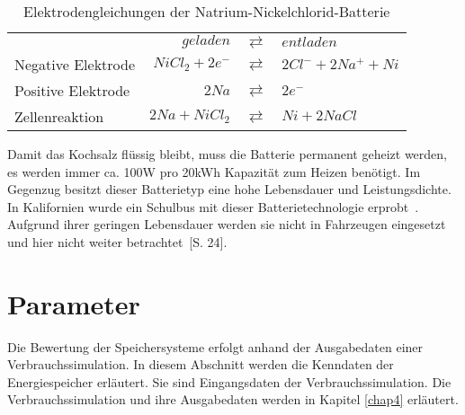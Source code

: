 \begin{table}\centering %
	\begin{tabularx}{\linewidth}{XrcX}
		\toprule
		&       $geladen$ & $\rightleftarrows$ & $entladen$           \\
		Negative Elektrode & $NiCl_2 + 2e^-$ & $\rightleftarrows$ & $2Cl^- + 2Na^+ + Ni$ \\
		Positive Elektrode &           $2Na$ & $\rightleftarrows$ & $2e^-$               \\ \midrule
		Zellenreaktion     &  $2Na + NiCl_2$ & $\rightleftarrows$ & $Ni + 2NaCl$ \\ \bottomrule
	\end{tabularx}
	\caption{Elektrodengleichungen der Natrium-Nickelchlorid-Batterie}
	\label{ZEBRA}
\end{table}

Damit das Kochsalz flüssig bleibt, muss die Batterie permanent geheizt werden, es werden immer ca. 100W pro 20kWh Kapazität zum Heizen benötigt. Im Gegenzug besitzt dieser Batterietyp eine hohe Lebensdauer und Leistungsdichte. In Kalifornien wurde ein Schulbus mit dieser Batterietechnologie erprobt~\cite{Electric-Transportation-Department:2004}. Aufgrund ihrer geringen Lebensdauer werden sie nicht in Fahrzeugen eingesetzt und hier nicht weiter betrachtet~\cite{Schimke:2012}[S. 24].

\section{Parameter}
Die Bewertung der Speichersysteme erfolgt anhand der Ausgabedaten einer Verbrauchssimulation. In diesem Abschnitt werden die Kenndaten der Energiespeicher erläutert. Sie sind Eingangsdaten der Verbrauchssimulation. Die Verbrauchssimulation und ihre Ausgabedaten werden in Kapitel \ref{chap4} erläutert.

